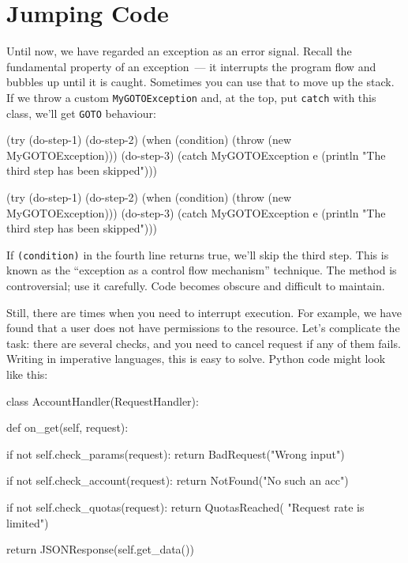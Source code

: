 \section{Jumping Code}


Until now, we have regarded an exception as an error signal. Recall the fundamental property of an exception~--- it interrupts the program flow and bubbles up until it is caught. Sometimes you can use that to move up the stack. If we throw a custom \verb|MyGOTOException| and, at the top, put \verb|catch| with this class, we'll get \verb|GOTO| behaviour:

\ifnarrow

\begin{clojure/lines}
(try
  (do-step-1)
  (do-step-2)
  (when (condition)
    (throw (new MyGOTOException)))
  (do-step-3)
  (catch MyGOTOException e
    (println "The third step
                  has been skipped")))
\end{clojure/lines}

\else

\begin{clojure/lines}
(try
  (do-step-1)
  (do-step-2)
  (when (condition)
    (throw (new MyGOTOException)))
  (do-step-3)
  (catch MyGOTOException e
    (println "The third step has been skipped")))
\end{clojure/lines}

\fi

If \verb|(condition)| in the fourth line returns true, we'll skip the third
step. This is known as the ``exception as a control flow mechanism''
technique. The method is controversial; use it carefully. Code becomes obscure
and difficult to maintain.


Still, there are times when you need to interrupt execution. For example, we have found that a user does not have permissions to the resource. Let's complicate the task: there are several checks, and you need to cancel request if any of them fails. Writing in imperative languages, this is easy to solve. Python code might look like this:


\ifnarrow

\begin{english}
  \begin{python}
class AccountHandler(RequestHandler):

  def on_get(self, request):

    if not self.check_params(request):
      return BadRequest("Wrong input")

    if not self.check_account(request):
      return NotFound("No such an acc")

    if not self.check_quotas(request):
      return QuotasReached(
             "Request rate is limited")

    return JSONResponse(self.get_data())
  \end{python}
\end{english}

